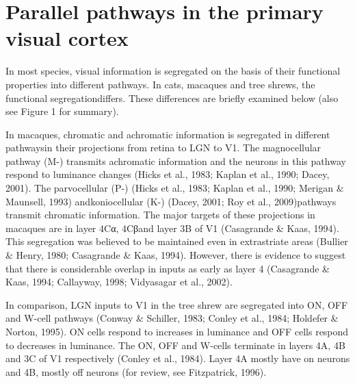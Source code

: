 \section{Parallel pathways in the primary visual cortex}

In most species, visual information is segregated on the basis of their functional properties into different pathways. In cats, macaques and tree shrews, the functional segregationdiffers. These differences are briefly examined below (also see Figure 1 for summary).

In macaques, chromatic and achromatic information is segregated in different pathwaysin their projections from retina to LGN to V1. The magnocellular pathway (M-) transmits achromatic information and the neurons in this pathway respond to luminance changes (Hicks et al., 1983; Kaplan et al., 1990; Dacey, 2001). The parvocellular (P-) (Hicks et al., 1983; Kaplan et al., 1990; Merigan \& Maunsell, 1993) andkoniocellular (K-) (Dacey, 2001; Roy et al., 2009)pathways transmit chromatic information. The  major targets of these projections in macaques are in layer 4Cα, 4Cβand layer 3B of V1 (Casagrande \& Kaas, 1994). This segregation was believed to be maintained even in extrastriate areas (Bullier \& Henry, 1980; Casagrande \& Kaas, 1994). However, there is evidence to suggest that there is considerable overlap in inputs as early as layer 4 (Casagrande \& Kaas, 1994; Callayway, 1998; Vidyasagar et al., 2002).

In comparison, LGN inputs to V1 in the tree shrew are segregated into ON, OFF and W-cell pathways (Conway \& Schiller, 1983; Conley et al., 1984; Holdefer \& Norton, 1995). ON cells respond to increases in luminance and OFF cells respond to decreases in luminance. The ON, OFF and W-cells terminate in layers 4A, 4B and 3C of V1 respectively (Conley et al., 1984). Layer 4A mostly have on neurons and 4B, mostly off neurons (for review, see Fitzpatrick, 1996).

